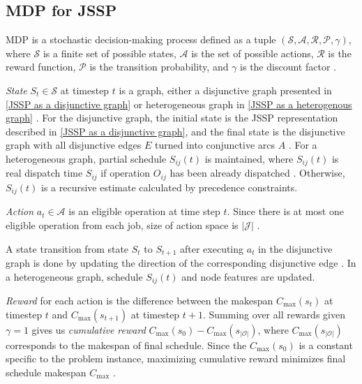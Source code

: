 \subsection{MDP for JSSP}

MDP is a stochastic decision-making process defined as a tuple $(\mathcal{S}, \mathcal{A}, \mathcal{R}, \mathcal{P}, \gamma)$, where $\mathcal{S}$ is a finite set of possible states, $\mathcal{A}$ is the set of possible actions, $\mathcal{R}$ is the reward function,  $\mathcal{P}$ is the transition probability, and $\gamma$ is the discount factor \cite{10226873, jssp_rl_env}. 
\par
\textit{State} $S_t \in \mathcal{S}$ at timestep $t$ is a graph, either a disjunctive graph presented in \ref{JSSP as a disjunctive graph} \cite{zhang2020learning} or heterogeneous graph in \ref{JSSP as a heterogenous graph} \cite{10226873}. For the disjunctive graph, the initial state is the JSSP representation described in \ref{JSSP as a disjunctive graph}, and the final state is the disjunctive graph with all disjunctive edges $E$ turned into conjunctive arcs $A$ \cite{zhang2020learning}. For a heterogeneous graph, partial schedule $S_{ij}(t)$ is maintained, where $S_{ij}(t)$ is real dispatch time $S_{ij}$ if operation $O_{ij}$ has been already dispatched \cite{9826438}. Otherwise, $S_{ij}(t)$ is a recursive estimate calculated by precedence constraints.
\par
\textit{Action} $a_t \in \mathcal{A}$ is an eligible operation at time step $t$. Since there is at most one eligible operation from each job, size of action space is $\left|\mathcal{J}\right|$ \cite{zhang2020learning}.
\par
A state transition from state $S_t$ to $S_{t+1}$ after executing $a_t$ in the disjunctive graph is done by updating the direction of the corresponding disjunctive edge \cite{zhang2020learning}. In a heterogeneous graph, schedule $S_{ij}(t)$ and node features are updated.

\textit{Reward} for each action is the difference between the makespan $C_\text{max}(s_t)$ at timestep $t$ and $C_\text{max}(s_{t+1})$ at timestep $t+1$. Summing over all rewards given $\gamma = 1$ gives us \textit{cumulative reward} $C_\text{max}(s_0) - C_\text{max}(s_{\left|\mathcal{O}\right|})$, where $C_\text{max}(s_{\left|\mathcal{O}\right|})$ corresponds to the makespan of final schedule. Since the $C_\text{max}(s_0)$ is a constant specific to the problem instance, maximizing cumulative reward minimizes final schedule makespan $C_\text{max}$ \cite{zhang2020learning, 10226873, 9826438}. 

